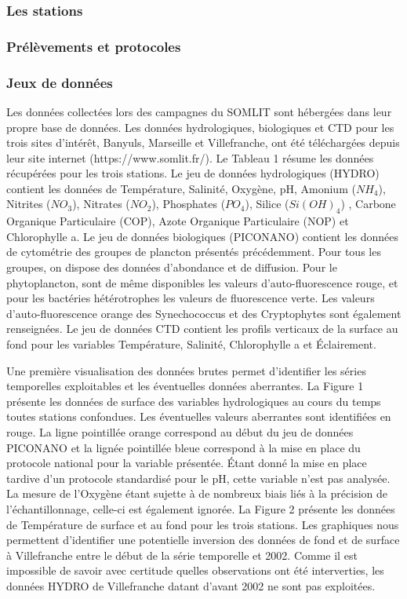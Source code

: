\documentclass[12pt]{article}
\begin{document}
\subsubsection{Les stations}

\subsubsection{Prélèvements et protocoles}

\subsubsection{Jeux de données}

Les données collectées lors des campagnes du SOMLIT sont hébergées dans leur propre base de données.  Les données hydrologiques, biologiques et CTD pour les trois sites d’intérêt, Banyuls, Marseille et Villefranche, ont été téléchargées depuis leur site internet (https://www.somlit.fr/).  Le Tableau 1 résume les données récupérées pour les trois stations. Le jeu de données hydrologiques (HYDRO) contient les données de Température, Salinité, Oxygène, pH, Amonium ($NH_4$), Nitrites ($NO_3$), Nitrates ($NO_2$), Phosphates ($PO_4$), Silice ($Si(OH)_4$) , Carbone Organique Particulaire (COP), Azote Organique Particulaire (NOP) et  Chlorophylle a. Le jeu de données biologiques (PICONANO) contient les données de cytométrie des groupes de plancton présentés précédemment. Pour tous les groupes, on dispose des données d’abondance et de diffusion. Pour le phytoplancton, sont de même disponibles les valeurs d’auto-fluorescence rouge, et pour les bactéries hétérotrophes les valeurs de fluorescence verte. Les valeurs d’auto-fluorescence orange des Synechococcus et des Cryptophytes sont également renseignées. Le jeu de données CTD contient les profils verticaux de la surface au fond pour les variables Température, Salinité, Chlorophylle a et Éclairement. 

Une première visualisation des données brutes permet d’identifier les séries temporelles exploitables et les éventuelles données aberrantes. La Figure 1 présente les données de surface des variables hydrologiques au cours du temps toutes stations confondues. Les éventuelles valeurs aberrantes sont identifiées en rouge. La ligne pointillée orange correspond au début du jeu de données PICONANO et la lignée pointillée bleue correspond à la mise en place du protocole national pour la variable présentée. Étant donné la mise en place tardive d’un protocole standardisé pour le pH, cette variable n’est pas analysée. La mesure de l’Oxygène étant sujette à de nombreux biais liés à la précision de l’échantillonnage, celle-ci est également ignorée. La Figure 2 présente les données de Température de surface et au fond pour les trois stations. Les graphiques nous permettent d’identifier une potentielle inversion des données de fond et de surface à Villefranche entre le début de la série temporelle et 2002. Comme il est impossible de savoir avec certitude quelles observations ont été interverties, les données HYDRO de Villefranche datant d’avant  2002 ne sont pas exploitées. 
\end{document}
